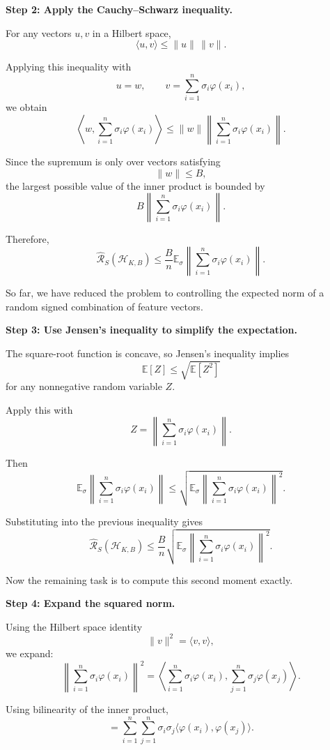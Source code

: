 \documentclass[11pt]{article}
\newcommand{\E}{\mathbb{E}}
\begin{document}
\begin{enumerate}
\begin{solutionbox}
\medskip

\textbf{Step 2: Apply the Cauchy--Schwarz inequality.}

For any vectors $u,v$ in a Hilbert space,
\[
\langle u,v\rangle
\le
\|u\|\,\|v\|.
\]

Applying this inequality with
\[
u=w,
\qquad
v=\sum_{i=1}^n\sigma_i\varphi(x_i),
\]
we obtain
\[
\left\langle
w,
\sum_{i=1}^n\sigma_i\varphi(x_i)
\right\rangle
\le
\|w\|
\left\|
\sum_{i=1}^n\sigma_i\varphi(x_i)
\right\|.
\]

Since the supremum is only over vectors satisfying
\[
\|w\|\le B,
\]
the largest possible value of the inner product is bounded by
\[
B
\left\|
\sum_{i=1}^n\sigma_i\varphi(x_i)
\right\|.
\]

Therefore,
\[
\widehat{\mathcal R}_S(\mathcal H_{K,B})
\le
\frac{B}{n}
\E_\sigma
\left\|
\sum_{i=1}^n\sigma_i\varphi(x_i)
\right\|.
\]

So far, we have reduced the problem to controlling the expected norm of a random signed combination of feature vectors.

\medskip

\textbf{Step 3: Use Jensen's inequality to simplify the expectation.}

The square-root function is concave, so Jensen's inequality implies
\[
\E[Z]
\le
\sqrt{\E[Z^2]}
\]
for any nonnegative random variable $Z$.

Apply this with
\[
Z=
\left\|
\sum_{i=1}^n\sigma_i\varphi(x_i)
\right\|.
\]

Then
\[
\E_\sigma
\left\|
\sum_{i=1}^n\sigma_i\varphi(x_i)
\right\|
\le
\sqrt{
\E_\sigma
\left\|
\sum_{i=1}^n\sigma_i\varphi(x_i)
\right\|^2
}.
\]

Substituting into the previous inequality gives
\[
\widehat{\mathcal R}_S(\mathcal H_{K,B})
\le
\frac{B}{n}
\sqrt{
\E_\sigma
\left\|
\sum_{i=1}^n\sigma_i\varphi(x_i)
\right\|^2
}.
\]

Now the remaining task is to compute this second moment exactly.

\medskip

\textbf{Step 4: Expand the squared norm.}

Using the Hilbert space identity
\[
\|v\|^2=\langle v,v\rangle,
\]
we expand:
\[
\left\|
\sum_{i=1}^n\sigma_i\varphi(x_i)
\right\|^2
=
\left\langle
\sum_{i=1}^n\sigma_i\varphi(x_i),
\sum_{j=1}^n\sigma_j\varphi(x_j)
\right\rangle.
\]

Using bilinearity of the inner product,
\[
=
\sum_{i=1}^n
\sum_{j=1}^n
\sigma_i\sigma_j
\langle
\varphi(x_i),
\varphi(x_j)
\rangle.
\]


\end{solutionbox}
\end{enumerate}
\end{document}
